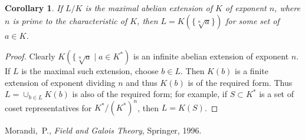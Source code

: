 \documentclass[12pt]{article}
\newtheorem{cor}[thm]{Corollary}
\begin{document}
\begin{cor} If $L/K$ is the maximal abelian extension of $K$ of exponent $n$, where $n$ is prime to the characteristic of $K$, then $L = K(\{\sqrt[n]{a}\})$ for some set of $a\in K$.
\end{cor}
\begin{proof}
Clearly $K(\{\sqrt[n]{a}\mid a \in K^*)$ is an infinite abelian extension of exponent $n$. If $L$ is the maximal such extension, choose $b \in L$. Then $K(b)$ is a finite extension of exponent dividing $n$ and thus $K(b)$ is of the required form. Thus $L=\cup_{b\in L} K(b)$ is also of the required form; for example, if $S\subset K^*$ is a set of coset representatives for $K^*/(K^*)^n$, then $L=K(S)$.
\end{proof}

\begin{thebibliography}{10}
Morandi,~P., \emph{Field and Galois Theory}, Springer, 1996.
\end{thebibliography}
\end{document}
